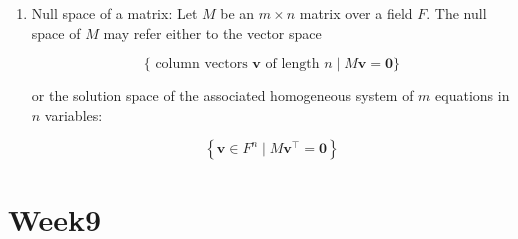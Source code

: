 \documentclass{article}
\begin{document}
\begin{enumerate}
        \item Null space of a matrix: Let $M$ be an $m \times n$ matrix over a field $F$. The null space of $M$ may refer either to the vector space

        $$
        \{\text { column vectors } \mathbf{v} \text { of length } n \mid M \mathbf{v}=\mathbf{0}\}
        $$

        or the solution space of the associated homogeneous system of $m$ equations in $n$ variables:

        $$
        \left\{\mathbf{v} \in F^{n} \mid M \mathbf{v}^{\top}=\mathbf{0}\right\}
        $$
    \end{enumerate}

\section{Week9}
\end{document}
